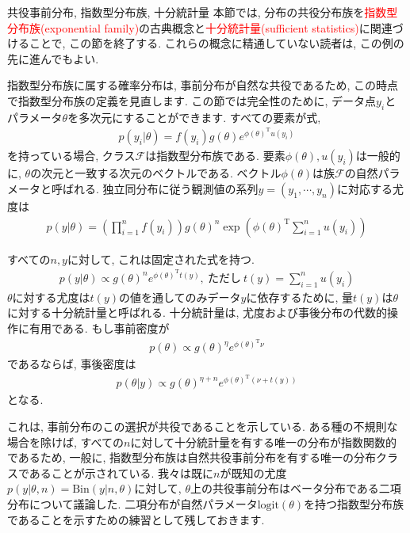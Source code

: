 \documentclass[10pt,dvipdfmx,a4]{beamer}
\newcommand{\eqn}[1]{\begin{align*}#1\end{align*}}
\newcommand{\tcr}[1]{\textcolor{red}{#1}}
\begin{document}

\begin{frame}{共役事前分布, 指数型分布族, 十分統計量}
本節では, 分布の共役分布族を\tcr{指数型分布族(exponential family)}の古典概念と\tcr{十分統計量(sufficient statistics)}に関連づけることで, この節を終了する.
これらの概念に精通していない読者は, この例の先に進んでもよい.

指数型分布族に属する確率分布は, 事前分布が自然な共役であるため, この時点で指数型分布族の定義を見直します.
この節では完全性のために, データ点$y_i$とパラメータ$\theta$を多次元にすることができます.
すべての要素が式,
\eqn{p(y_i|\theta)=f(y_i)g(\theta)e^{\phi(\theta)^{\mathrm{T}}u(y_i)}}
を持っている場合, クラス$\mathcal{F}$は指数型分布族である.
要素$\phi(\theta), u(y_i)$は一般的に, $\theta$の次元と一致する次元のベクトルである.
ベクトル$\phi(\theta)$は族$\mathcal{F}$の自然パラメータと呼ばれる.
独立同分布に従う観測値の系列$y=(y_1,\cdots,y_n)$に対応する尤度は
\eqn{p(y|\theta)=\left(\prod_{i=1}^n f(y_i)\right) g(\theta)^n \exp \left( \phi(\theta)^{\mathrm{T}}\sum_{i=1}^n u(y_i)\right)}
\end{frame}


\begin{frame}
すべての$n, y$に対して, これは固定された式を持つ.
\eqn{p(y|\theta)\propto g(\theta)^n e^{\phi(\theta)^{\mathrm{T}}t(y)},\ \text{ただし}\ t(y)=\sum_{i=1}^nu(y_i)} 
$\theta$に対する尤度は$t(y)$の値を通してのみデータ$y$に依存するために, 量$t(y)$は$\theta$に対する十分統計量と呼ばれる.
十分統計量は, 尤度および事後分布の代数的操作に有用である.
もし事前密度が
\eqn{p(\theta)\propto g(\theta)^{\eta}e^{\phi(\theta)^{\mathrm{T}}\nu}}
であるならば, 事後密度は
\eqn{p(\theta|y)\propto g(\theta)^{\eta+n}e^{\phi(\theta)^{\mathrm{T}}(\nu+t(y))}}
となる.

これは, 事前分布のこの選択が共役であることを示している.
ある種の不規則な場合を除けば, すべての$n$に対して十分統計量を有する唯一の分布が指数関数的であるため, 一般に, 指数型分布族は自然共役事前分布を有する唯一の分布クラスであることが示されている.
我々は既に$n$が既知の尤度$p(y|\theta, n)=\text{Bin}(y|n, \theta)$に対して, $\theta$上の共役事前分布はベータ分布である二項分布について議論した.
二項分布が自然パラメータ$\text{logit}(\theta)$を持つ指数型分布族であることを示すための練習として残しておきます.
\end{frame}

\end{document}
